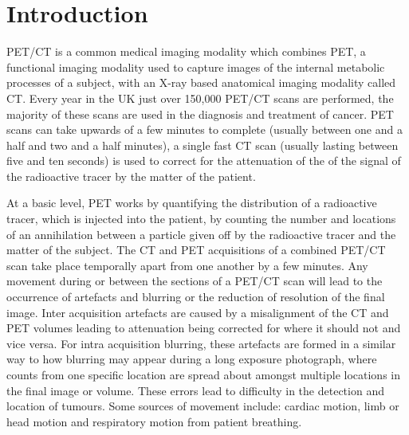 \chapter{Introduction} \label{introduction}
    \blindtext
    
        \gls{PET}/\gls{CT} is a common medical imaging modality which combines \gls{PET}, a functional imaging modality used to capture images of the internal metabolic processes of a subject, with an X-ray based anatomical imaging modality called \gls{CT}. Every year in the UK just over 150,000 \gls{PET}/\gls{CT} scans are performed, the majority of these scans are used in the diagnosis and treatment of cancer. \gls{PET} scans can take upwards of a few minutes to complete (usually between one and a half and two and a half minutes), a single fast \gls{CT} scan (usually lasting between five and ten seconds) is used to correct for the attenuation of the of the signal of the radioactive tracer by the matter of the patient.
        
        At a basic level, \gls{PET} works by quantifying the distribution of a radioactive tracer, which is injected into the patient, by counting the number and locations of an annihilation between a particle given off by the radioactive tracer and the matter of the subject. The \gls{CT} and \gls{PET} acquisitions of a combined \gls{PET}/\gls{CT} scan take place temporally apart from one another by a few minutes. Any movement during or between the sections of a \gls{PET}/\gls{CT} scan will lead to the occurrence of artefacts and blurring or the reduction of resolution of the final image. Inter acquisition artefacts are caused by a misalignment of the \gls{CT} and \gls{PET} volumes leading to attenuation being corrected for where it should not and vice versa. For intra acquisition blurring, these artefacts are formed in a similar way to how blurring may appear during a long exposure photograph, where counts from one specific location are spread about amongst multiple locations in the final image or volume. These errors lead to difficulty in the detection and location of tumours. Some sources of movement include: cardiac motion, limb or head motion and respiratory motion from patient breathing.
        

